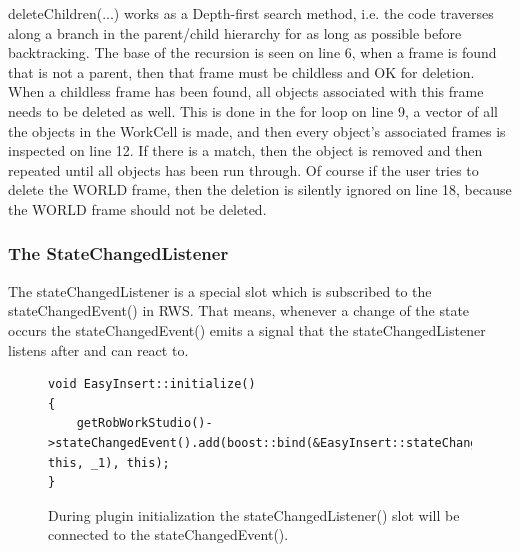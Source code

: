 deleteChildren(...) works as a Depth-first search method, i.e. the code traverses along a branch in the parent/child hierarchy for as long as possible before backtracking. The base of the recursion is seen on line 6, when a frame is found that is not a parent, then that frame must be childless and OK for deletion.
When a childless frame has been found, all objects associated with this frame needs to be deleted as well. This is done in the for loop on line 9, a vector of all the objects in the WorkCell is made, and then every object's associated frames is inspected on line 12. If there is a match, then the object is removed and then repeated until all objects has been run through. Of course if the user tries to delete the WORLD frame, then the deletion is silently ignored on line 18, because the WORLD frame should not be deleted.

\subsubsection{The StateChangedListener}
\label{sec:eiStateChangedListener}

The stateChangedListener is a special slot which is subscribed to the stateChangedEvent() in RWS. That means, whenever a change of the state occurs the stateChangedEvent() emits a signal that the stateChangedListener listens after and can react to. 

\begin{figure}[h] %
\centering
\lstset{language=C++} 
\begin{lstlisting}[frame=single] 
void EasyInsert::initialize()
{
    getRobWorkStudio()->stateChangedEvent().add(boost::bind(&EasyInsert::stateChangedListener, this, _1), this);
}
\end{lstlisting}
\caption{During plugin initialization the stateChangedListener() slot will be connected to the stateChangedEvent().}
\label{fig:eiStateChangedListener} 	
\end{figure}

